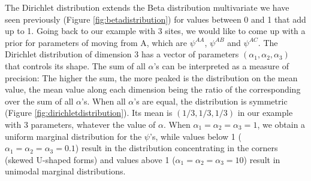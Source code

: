 \documentclass[
  12pt,
]{krantz}
\begin{document}
The Dirichlet distribution extends the Beta distribution multivariate we have seen previously (Figure \ref{fig:betadistribution}) for values between 0 and 1 that add up to 1. Going back to our example with 3 sites, we would like to come up with a prior for parameters of moving from A, which are \(\psi^{AA}\), \(\psi^{AB}\) and \(\psi^{AC}\). The Dirichlet distribution of dimension 3 has a vector of parameters \((\alpha_1, \alpha_2, \alpha_3)\) that controls its shape. The sum of all \(\alpha\)'s can be interpreted as a measure of precision: The higher the sum, the more peaked is the distribution on the mean value, the mean value along each dimension being the ratio of the corresponding over the sum of all \(\alpha\)'s. When all \(\alpha\)'s are equal, the distribution is symmetric (Figure \ref{fig:dirichletdistribution}). Its mean is \((1/3, 1/3, 1/3)\) in our example with 3 parameters, whatever the value of \(\alpha\). When \(\alpha_1 = \alpha_2 = \alpha_3 = 1\), we obtain a uniform marginal distribution for the \(\psi\)'s, while values below 1 (\(\alpha_1 = \alpha_2 = \alpha_3 = 0.1\)) result in the distribution concentrating in the corners (skewed U-shaped forms) and values above 1 (\(\alpha_1 = \alpha_2 = \alpha_3 = 10\)) result in unimodal marginal distributions.
\end{document}

